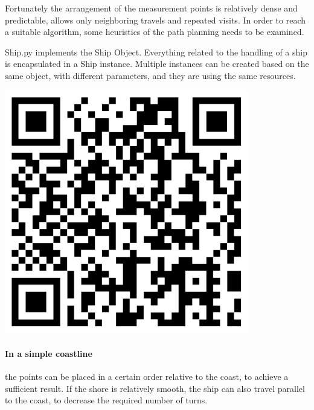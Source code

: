 Fortunately the arrangement of the measurement points is relatively dense and predictable, allows only neighboring travels and repeated visits. In order to reach a suitable algorithm, some heuristics of the path planning needs to be examined.
\\

\begin{tcolorbox}[colback=cyan!5,colframe=cyan!40!black,title=Code: Ship.py \\ https://www.dropbox.com/s/fmtsaatql7jqjhw/Ship\texttt{\_}nofilter.py]
\begin{minipage}{0,6\textwidth}
Ship.py implements the Ship Object. Everything related to the handling of a ship is encapsulated in a Ship instance. Multiple instances can be created based on the same object, with different parameters, and they are using the same resources.
\end{minipage}
\begin{minipage}{0,35\textwidth}
\raggedleft
\includegraphics[width=0.8\textwidth]{img/ship}
\end{minipage}
\end{tcolorbox}

\paragraph{In a simple coastline} the points can be placed in a certain order relative to the coast, to achieve a sufficient result. If the shore is relatively smooth, the ship can also travel parallel to the coast, to decrease the required number of turns.

